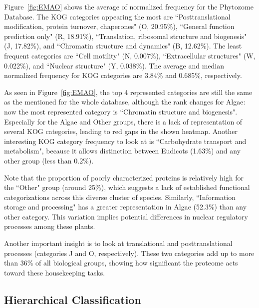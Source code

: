 Figure~\ref{fig:EMAO} shows the average of normalized frequency 
for the Phytozome Database. The KOG categories 
appearing the most are ``Posttranslational modification, 
protein turnover, chaperones" (O, 20.95\%), ``General function 
prediction only" (R, 18.91\%), ``Translation, ribosomal 
structure and biogenesis" (J, 17.82\%), and ``Chromatin 
structure and dynamics" (B, 12.62\%). The least frequent 
categories are ``Cell motility" (N, 0.007\%), ``Extracellular 
structures" (W, 0.022\%), and ``Nuclear structure" 
(Y, 0.038\%). The average and median normalized frequency 
for KOG categories are 3.84\% and 0.685\%, respectively. 

As seen in Figure~\ref{fig:EMAO}, the top 4 represented 
categories are still the same as the mentioned for the whole 
database, although the rank changes for Algae: now the most 
represented category is ``Chromatin structure and 
biogenesis". Especially for the Algae and Other groups, there 
is a lack of representation of several KOG categories, 
leading to red gaps in the shown heatmap.
Another interesting KOG category frequency to look at is 
``Carbohydrate transport and metabolism", because it 
allows distinction between Eudicots (1.63\%) and any other 
group (less than 0.2\%).

Note that the proportion of poorly characterized proteins 
is relatively high for the ``Other" group (around 25\%), 
which suggests a lack of established functional 
categorizations across this diverse cluster of species. 
Similarly, ``Information storage and processing" has a 
greater representation in Algae (52.3\%) than any other 
category. This variation implies potential differences 
in nuclear regulatory processes among these plants.

Another important insight is to look at translational 
and posttranslational processes (categories J and O, 
respectively). These two categories add up to more than 
36\% of all biological groups, showing how significant the 
proteome acts toward these housekeeping tasks.


\subsection{Hierarchical Classification}
\label{sec:results.hierarchy}


